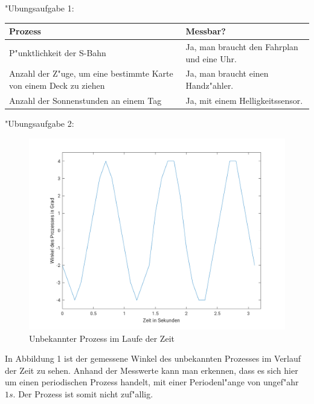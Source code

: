 \documentclass[fleqn,a4paper,12pt]{article}
\begin{document}
"Ubungsaufgabe 1: \newline

\begin{center}
\begin{tabular}{|p{10cm}|p{5cm}|}
	\hline \textbf{Prozess} & \textbf{Messbar?} \\
	\hline P"unktlichkeit der S-Bahn & Ja, man braucht den Fahrplan und eine Uhr. \\
	\hline Anzahl der Z"uge, um eine bestimmte Karte von einem Deck zu ziehen & Ja, man braucht einen Handz"ahler. \\
	\hline Anzahl der Sonnenstunden an einem Tag & Ja, mit einem Helligkeitssensor. \\
	\hline
\end{tabular}
\end{center}

"Ubungsaufgabe 2: \newline

\begin{figure}[h]
\caption{Unbekannter Prozess im Laufe der Zeit}
\centering
\includegraphics[width=1.0\textwidth]{unbekannterprozess}
\end{figure}

In Abbildung 1 ist der gemessene Winkel des unbekannten Prozesses im Verlauf der Zeit zu sehen. Anhand der Messwerte kann man erkennen, dass es sich hier um einen periodischen Prozess handelt, mit einer Periodenl"ange von ungef"ahr $1s$. Der Prozess ist somit nicht zuf"allig.
\end{document}
